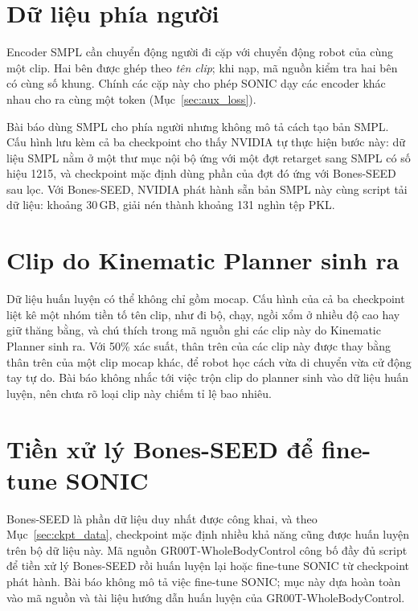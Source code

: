 \documentclass[12pt,a4paper,oneside]{report}
\begin{document}
\section{Dữ liệu phía người}
\label{sec:step_human}

Encoder SMPL cần chuyển động người đi cặp với chuyển động robot của cùng một clip. Hai bên được ghép theo \emph{tên clip}; khi nạp, mã nguồn kiểm tra hai bên có cùng số khung. Chính các cặp này cho phép SONIC dạy các encoder khác nhau cho ra cùng một token (Mục~\ref{sec:aux_loss}).

Bài báo dùng SMPL cho phía người nhưng không mô tả cách tạo bản SMPL. Cấu hình lưu kèm cả ba checkpoint cho thấy NVIDIA tự thực hiện bước này: dữ liệu SMPL nằm ở một thư mục nội bộ ứng với một đợt retarget sang SMPL có số hiệu 1215, và checkpoint mặc định dùng phần của đợt đó ứng với Bones-SEED sau lọc. Với Bones-SEED, NVIDIA phát hành sẵn bản SMPL này cùng script tải dữ liệu: khoảng 30\,GB, giải nén thành khoảng 131 nghìn tệp PKL.

\section{Clip do Kinematic Planner sinh ra}
\label{sec:planner_clips}

Dữ liệu huấn luyện có thể không chỉ gồm mocap. Cấu hình của cả ba checkpoint liệt kê một nhóm tiền tố tên clip, như đi bộ, chạy, ngồi xổm ở nhiều độ cao hay giữ thăng bằng, và chú thích trong mã nguồn ghi các clip này do Kinematic Planner sinh ra. Với 50\% xác suất, thân trên của các clip này được thay bằng thân trên của một clip mocap khác, để robot học cách vừa di chuyển vừa cử động tay tự do. Bài báo không nhắc tới việc trộn clip do planner sinh vào dữ liệu huấn luyện, nên chưa rõ loại clip này chiếm tỉ lệ bao nhiêu.

\section{Tiền xử lý Bones-SEED để fine-tune SONIC}
\label{sec:bones_prep}

Bones-SEED là phần dữ liệu duy nhất được công khai, và theo Mục~\ref{sec:ckpt_data}, checkpoint mặc định nhiều khả năng cũng được huấn luyện trên bộ dữ liệu này. Mã nguồn GR00T-WholeBodyControl công bố đầy đủ script để tiền xử lý Bones-SEED rồi huấn luyện lại hoặc fine-tune SONIC từ checkpoint phát hành. Bài báo không mô tả việc fine-tune SONIC; mục này dựa hoàn toàn vào mã nguồn và tài liệu hướng dẫn huấn luyện của GR00T-WholeBodyControl.
\end{document}

